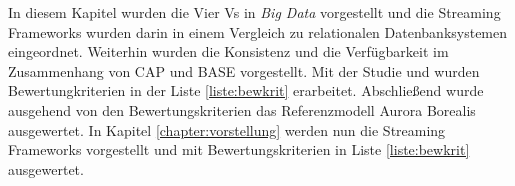 In diesem Kapitel wurden die Vier Vs in \textit{Big Data} vorgestellt und die Streaming Frameworks wurden darin in einem Vergleich zu relationalen Datenbanksystemen eingeordnet. Weiterhin wurden die Konsistenz und die Verfügbarkeit im Zusammenhang von CAP und BASE vorgestellt. Mit der Studie  und  wurden Bewertungkriterien in der Liste \ref{liste:bewkrit} erarbeitet. Abschließend wurde ausgehend von den Bewertungskriterien das Referenzmodell Aurora Borealis ausgewertet. In Kapitel \ref{chapter:vorstellung} werden nun die Streaming Frameworks vorgestellt und mit Bewertungskriterien in Liste \ref{liste:bewkrit} ausgewertet.